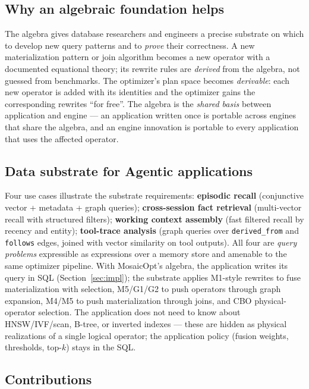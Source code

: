 \documentclass[acmsmall,review,anonymous]{acmart}
\theoremstyle{plain}
\theoremstyle{definition}
\theoremstyle{remark}
\begin{document}
\subsection{Why an algebraic foundation helps}\label{sec:intro:support}

The algebra gives database researchers and engineers a precise
substrate on which to develop new query patterns and to \emph{prove}
their correctness. A new materialization pattern or join algorithm
becomes a new operator with a documented equational theory; its
rewrite rules are \emph{derived} from the algebra, not guessed from
benchmarks. The optimizer's plan space becomes \emph{derivable}:
each new operator is added with its identities and the optimizer
gains the corresponding rewrites ``for free''. The algebra is the
\emph{shared basis} between application and engine --- an
application written once is portable across engines that share the
algebra, and an engine innovation is portable to every application
that uses the affected operator.

\subsection{Data substrate for Agentic applications}\label{sec:intro:substrate}

Four use cases illustrate the substrate requirements:
\textbf{episodic recall} (conjunctive vector + metadata + graph
queries); \textbf{cross-session fact retrieval} (multi-vector recall
with structured filters); \textbf{working context assembly} (fast
filtered recall by recency and entity); \textbf{tool-trace analysis}
(graph queries over \texttt{derived\_from} and \texttt{follows}
edges, joined with vector similarity on tool outputs). All four are
\emph{query problems} expressible as expressions over a memory store
and amenable to the same optimizer pipeline. With MosaicOpt's
algebra, the application writes its query in SQL
(Section~\ref{sec:impl}); the substrate applies M1-style rewrites to
fuse materialization with selection, M5/G1/G2 to push operators
through graph expansion, M4/M5 to push materialization through
joins, and CBO physical-operator selection. The application does not
need to know about HNSW/IVF/scan, B-tree, or inverted indexes ---
these are hidden as physical realizations of a single logical
operator; the application policy (fusion weights, thresholds,
top-$k$) stays in the SQL.

\subsection{Contributions}\label{sec:contrib}
\end{document}
